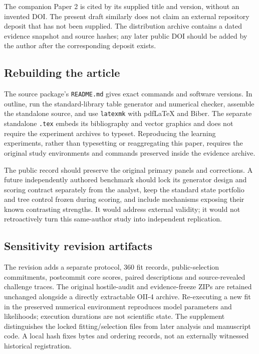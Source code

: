 The companion Paper 2 is cited by its supplied title and version, without an invented DOI. The present draft similarly does not claim an external repository deposit that has not been supplied. The distribution archive contains a dated evidence snapshot and source hashes; any later public DOI should be added by the author after the corresponding deposit exists.

\subsection{Rebuilding the article}
The source package's \texttt{README.md} gives exact commands and software versions. In outline, run the standard-library table generator and numerical checker, assemble the standalone source, and use \texttt{latexmk} with pdfLaTeX and Biber. The separate standalone \texttt{.tex} embeds its bibliography and vector graphics and does not require the experiment archives to typeset. Reproducing the learning experiments, rather than typesetting or reaggregating this paper, requires the original study environments and commands preserved inside the evidence archive.

The public record should preserve the original primary panels and corrections. A future independently authored benchmark should lock its generator design and scoring contract separately from the analyst, keep the standard state portfolio and tree control frozen during scoring, and include mechanisms exposing their known contrasting strengths. It would address external validity; it would not retroactively turn this same-author study into independent replication.

\subsection{Sensitivity revision artifacts}
The revision adds a separate protocol, 360 fit records, public-selection commitments, postcommit core scores, paired descriptions and source-revealed challenge traces. The original hostile-audit and evidence-freeze ZIPs are retained unchanged alongside a directly extractable OII-4 archive. Re-executing a new fit in the preserved numerical environment reproduces model parameters and likelihoods; execution durations are not scientific state. The supplement distinguishes the locked fitting/selection files from later analysis and manuscript code. A local hash fixes bytes and ordering records, not an externally witnessed historical registration.

